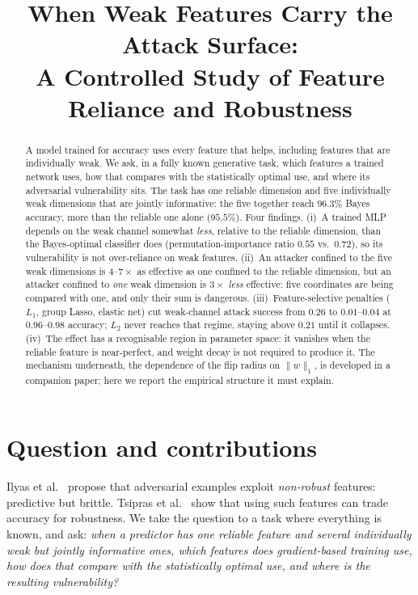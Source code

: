 \documentclass[11pt]{article}
\title{When Weak Features Carry the Attack Surface:\\
A Controlled Study of Feature Reliance and Robustness}
\author{}
\date{}
\begin{document}
\sloppy
\maketitle

\begin{abstract}
A model trained for accuracy uses every feature that helps, including features
that are individually weak. We ask, in a fully known generative task, which
features a trained network uses, how that compares with the statistically
optimal use, and where its adversarial vulnerability sits. The task has one
reliable dimension and five individually weak dimensions that are jointly
informative: the five together reach $96.3\%$ Bayes accuracy, more than the
reliable one alone ($95.5\%$). Four findings. (i)~A trained MLP depends on the
weak channel somewhat \emph{less}, relative to the reliable dimension, than the
Bayes-optimal classifier does (permutation-importance ratio $0.55$ vs.\ $0.72$), so
its vulnerability is not over-reliance on weak features. (ii)~An attacker confined
to the five weak dimensions is $4$--$7\times$ as effective as one confined to the
reliable dimension, but an attacker confined to \emph{one} weak dimension is $3\times$
\emph{less} effective: five coordinates are being compared with one, and only their sum is
dangerous. (iii)~Feature-selective penalties ($L_1$, group Lasso, elastic net) cut
weak-channel attack success from $0.26$ to $0.01$--$0.04$ at $0.96$--$0.98$ accuracy; $L_2$
never reaches that regime, staying above $0.21$ until it collapses. (iv)~The effect
has a recognisable region in parameter space: it vanishes when the reliable feature is
near-perfect, and weight decay is not required to produce it. The mechanism underneath,
the dependence of the flip radius on $\|w\|_1$, is developed in a companion paper; here
we report the empirical structure it must explain.
\end{abstract}

\section{Question and contributions}

Ilyas et al.~\cite{ilyas2019} propose that adversarial examples exploit
\emph{non-robust} features: predictive but brittle. Tsipras et
al.~\cite{tsipras2018} show that using such features can trade accuracy for
robustness. We take the question to a task where everything is known, and ask:
\emph{when a predictor has one reliable feature and several individually weak
but jointly informative ones, which features does gradient-based training use,
how does that compare with the statistically optimal use, and where is the
resulting vulnerability?}
\end{document}
